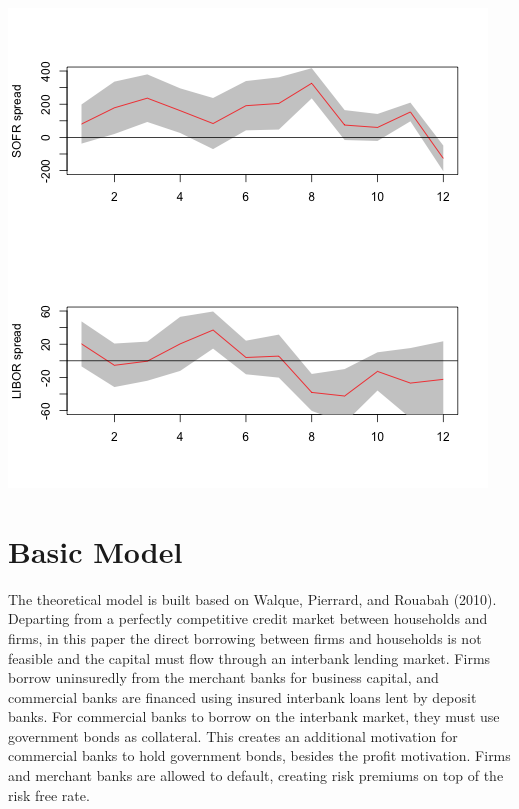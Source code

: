 \documentclass[12pt]{article}
\begin{document}
\begin{center}
  \includegraphics[scale=0.8]{../lp/results/irfs.png}
\end{center}

\newpage
\section{Basic Model}
The theoretical model is built based on Walque, Pierrard, and Rouabah (2010). Departing from a perfectly competitive credit market between households and firms, in this paper the direct borrowing between firms and households is not feasible and the capital must flow through an interbank lending market.
Firms borrow uninsuredly from the merchant banks for business capital, and commercial banks are financed using insured interbank loans lent by deposit banks. For commercial banks to borrow on the interbank market, they must use government bonds as collateral. This creates an additional motivation
for commercial banks to hold government bonds, besides the profit motivation. Firms and merchant banks are allowed to default, creating risk premiums on top of the risk free rate. 
\end{document}

